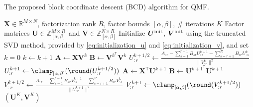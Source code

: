 \begin{algorithm}[!t]
    \caption{The proposed block coordinate descent (BCD) algorithm for QMF. \label{alg:bcd_for_qmf}}
    \begin{algorithmic}[1]
        \REQUIRE $\bm{X} \in \mathbb{R}^{M \times N}$, factorization rank $R$, factor bounds $[\alpha,\beta]$, \# iterations $K$
        \ENSURE Factor matrices $\bm{U} \in \mathbb{Z}_{[\alpha,\beta]}^{M \times R}$ and $\bm{V} \in \mathbb{Z}_{[\alpha,\beta]}^{N \times R}$
        \STATE Initialize $\bm{U}^{\rm init}$, $\bm{V}^{\rm init}$ using the truncated SVD method, provided by \eqref{eq:initialization_u} and \eqref{eq:initialization_v}, and set $k=0$
        \STATE $k \gets k+1$
        \STATE $\bm{A} \gets \bm{X} \bm{V}^k$
        \STATE $\bm{B} \gets \bm{V}^{k^{\mathsf{T}}} \bm{V}^k$
        \STATE \label{alg:step:u_update:1} $\displaystyle U_{:r}^{k+1/2} \gets \frac{A_{:r} - \sum_{s = 1}^{r-1} B_{sr} U_{:s}^{k+1} - \sum_{s=r+1}^R B_{sr} U_{:s}^k}{\| V_{:r}^k \|^2}$
        \vspace{2pt}
        \STATE \label{alg:step:u_update:2} $\displaystyle U_{:r}^{k+1} \gets \clamp_{[\alpha,\beta]}(\round( U_{:r}^{k+1/2}))$
        \ENDFOR
        \STATE $\bm{A} \gets \bm{X}^\mathsf{T} \bm{U}^{k+1}$
        \STATE $\bm{B} \gets \bm{U}^{{k+1}^\mathsf{T}} \bm{U}^{k+1}$
        \STATE \label{alg:step:v_update:1} $\displaystyle V_{:r}^{k+1/2} \gets \frac{A_{:r} - \sum_{s = 1}^{r-1} B_{sr} V_{:s}^{k+1} - \sum_{s = r+1}^R B_{sr} V_{:s}^k}{\| U_{:r}^{k+1} \|^2}$
        \vspace{2pt}
        \STATE \label{alg:step:v_update:2} $\displaystyle V_{:r}^{k+1} \gets \clamp_{[\alpha,\beta]}(\round(V_{:r}^{k+1/2}))$
        \ENDFOR
        \ENDWHILE
        \RETURN $(\bm{U}^K, \bm{V}^K)$
    \end{algorithmic}
\end{algorithm}

